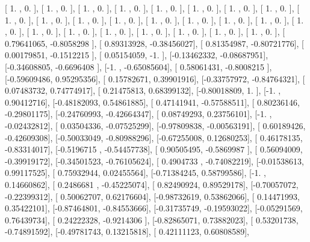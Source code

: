 \documentclass{article}
\begin{document}
       [ 1.        ,  0.        ],
       [ 1.        ,  0.        ],
       [ 1.        ,  0.        ],
       [ 1.        ,  0.        ],
       [ 1.        ,  0.        ],
       [ 1.        ,  0.        ],
       [ 1.        ,  0.        ],
       [ 1.        ,  0.        ],
       [ 1.        ,  0.        ],
       [ 1.        ,  0.        ],
       [ 1.        ,  0.        ],
       [ 1.        ,  0.        ],
       [ 1.        ,  0.        ],
       [ 1.        ,  0.        ],
       [ 1.        ,  0.        ],
       [ 1.        ,  0.        ],
       [ 1.        ,  0.        ],
       [ 1.        ,  0.        ],
       [ 1.        ,  0.        ],
       [ 1.        ,  0.        ],
       [ 1.        ,  0.        ],
       [ 1.        ,  0.        ],
       [ 1.        ,  0.        ],
       [ 1.        ,  0.        ],
       [ 0.79641065, -0.8058298 ],
       [ 0.89313928, -0.38456027],
       [ 0.81354987, -0.80721776],
       [ 0.00179851, -0.1512215 ],
       [ 0.05154059, -1.        ],
       [-0.13462332, -0.08687951],
       [-0.34608805, -0.6696408 ],
       [-1.        , -0.65085604],
       [ 0.58061431, -0.8008215 ],
       [-0.59609486,  0.95295356],
       [ 0.15782671,  0.39901916],
       [-0.33757972, -0.84764321],
       [ 0.07483732,  0.74774917],
       [ 0.21475813,  0.68399132],
       [-0.80018809,  1.        ],
       [-1.        ,  0.90412716],
       [-0.48182093,  0.54861885],
       [ 0.47141941, -0.57588511],
       [ 0.80236146, -0.29801175],
       [-0.24760993, -0.42664347],
       [ 0.08749293,  0.23756101],
       [-1.        , -0.02432812],
       [ 0.03504336, -0.07525299],
       [-0.97809838, -0.00563191],
       [ 0.60189426, -0.42609308],
       [-0.50033049, -0.80988296],
       [-0.67255008,  0.12680253],
       [ 0.46178135, -0.83314017],
       [-0.5196715 , -0.54457738],
       [ 0.90505495, -0.5869987 ],
       [ 0.56094009, -0.39919172],
       [-0.34501523, -0.76105624],
       [ 0.4904733 , -0.74082219],
       [-0.01538613,  0.99117525],
       [ 0.75932944,  0.02455564],
       [-0.71384245,  0.58799586],
       [-1.        ,  0.14660862],
       [ 0.2486681 , -0.45225074],
       [ 0.82490924,  0.89529178],
       [-0.70057072, -0.22399312],
       [ 0.50062707,  0.62176604],
       [-0.98732619,  0.53862066],
       [ 0.14471993,  0.35422101],
       [-0.87464801, -0.84553666],
       [-0.31735749, -0.19593022],
       [-0.05291569,  0.76439734],
       [ 0.24222328, -0.9214306 ],
       [-0.82865071,  0.73882023],
       [ 0.53201738, -0.74891592],
       [-0.49781743,  0.13215818],
       [ 0.42111123,  0.60808589],
\end{document}

